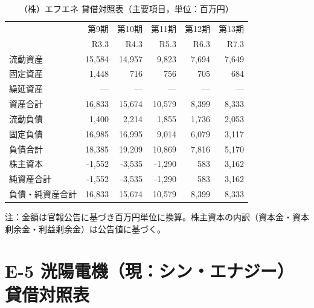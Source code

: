 \begin{table}[H]
\centering
\caption{（株）エフエネ 貸借対照表（主要項目，単位：百万円）}
\begin{tabular}{lrrrrr}
\toprule
 & 第9期 & 第10期 & 第11期 & 第12期 & 第13期 \\
 & R3.3 & R4.3 & R5.3 & R6.3 & R7.3 \\
\midrule
流動資産       & 15{,}584 & 14{,}957 & 9{,}823 & 7{,}694 & 7{,}649 \\
固定資産       & 1{,}448  & 716      & 756     & 705     & 684 \\
繰延資産       & —        & —        & —       & —       & — \\
\midrule
資産合計       & 16{,}833 & 15{,}674 & 10{,}579 & 8{,}399 & 8{,}333 \\
\midrule
流動負債       & 1{,}400  & 2{,}214  & 1{,}855  & 1{,}736 & 2{,}053 \\
固定負債       & 16{,}985 & 16{,}995 & 9{,}014  & 6{,}079 & 3{,}117 \\
負債合計       & 18{,}385 & 19{,}209 & 10{,}869 & 7{,}816 & 5{,}170 \\
\midrule
株主資本       & -1{,}552 & -3{,}535 & -1{,}290 & 583     & 3{,}162 \\
純資産合計     & -1{,}552 & -3{,}535 & -1{,}290 & 583     & 3{,}162 \\
\midrule
負債・純資産合計 & 16{,}833 & 15{,}674 & 10{,}579 & 8{,}399 & 8{,}333 \\
\bottomrule
\end{tabular}
\end{table}

\begin{flushleft}
\footnotesize
注：金額は官報公告に基づき百万円単位に換算。株主資本の内訳（資本金・資本剰余金・利益剰余金）は公告値に基づく。
\end{flushleft}

\section*{E-5 洸陽電機（現：シン・エナジー）貸借対照表}

